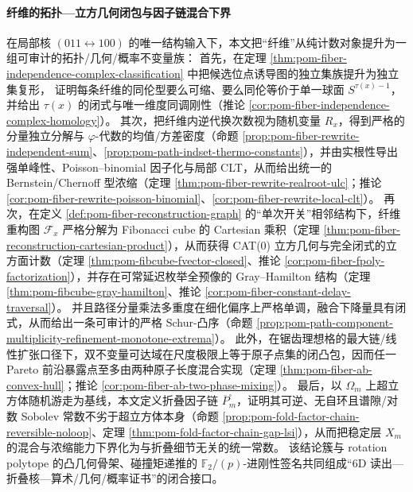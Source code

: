 \paragraph{纤维的拓扑—立方几何闭包与因子链混合下界}
在局部核 \((011\leftrightarrow 100)\) 的唯一结构输入下，本文把“纤维”从纯计数对象提升为一组可审计的拓扑/几何/概率不变量族：
首先，在定理 \ref{thm:pom-fiber-independence-complex-classification} 中把候选位点诱导图的独立集族提升为独立集复形，
证明每条纤维的同伦型要么可缩、要么同伦等价于单一球面 \(S^{\tau(x)-1}\)，并给出 \(\tau(x)\) 的闭式与唯一维度同调刚性（推论 \ref{cor:pom-fiber-independence-complex-homology}）。
其次，把纤维内逆代换次数视为随机变量 \(R_x\)，得到严格的分量独立分解与 \(\varphi\)-代数的均值/方差密度（命题 \ref{prop:pom-fiber-rewrite-independent-sum}、\ref{prop:pom-path-indset-thermo-constants}），并由实根性导出强单峰性、Poisson--binomial 因子化与局部 CLT，从而给出统一的 Bernstein/Chernoff 型浓缩（定理 \ref{thm:pom-fiber-rewrite-realroot-ulc}；推论 \ref{cor:pom-fiber-rewrite-poisson-binomial}、\ref{cor:pom-fiber-rewrite-local-clt}）。
再次，在定义 \ref{def:pom-fiber-reconstruction-graph} 的“单次开关”相邻结构下，纤维重构图 \(\mathcal F_x\) 严格分解为 Fibonacci cube 的 Cartesian 乘积（定理 \ref{thm:pom-fiber-reconstruction-cartesian-product}），从而获得 CAT(0) 立方几何与完全闭式的立方面计数（定理 \ref{thm:pom-fibcube-fvector-closed}、推论 \ref{cor:pom-fiber-fpoly-factorization}），并存在可常延迟枚举全预像的 Gray--Hamilton 结构（定理 \ref{thm:pom-fibcube-gray-hamilton}、推论 \ref{cor:pom-fiber-constant-delay-traversal}）。
并且路径分量乘法多重度在细化偏序上严格单调，融合下降量具有闭式，从而给出一条可审计的严格 Schur-凸序（命题 \ref{prop:pom-path-component-multiplicity-refinement-monotone-extrema}）。
此外，在锯齿理想格的最大链/线性扩张口径下，双不变量可达域在尺度极限上等于原子点集的闭凸包，因而任一 Pareto 前沿暴露点至多由两种原子长度混合实现（定理 \ref{thm:pom-fiber-ab-convex-hull}；推论 \ref{cor:pom-fiber-ab-two-phase-mixing}）。
最后，以 \(\Omega_m\) 上超立方体随机游走为基线，本文定义折叠因子链 \(\overline P^{\square}_m\)，证明其可逆、无自环且谱隙/对数 Sobolev 常数不劣于超立方体本身（命题 \ref{prop:pom-fold-factor-chain-reversible-noloop}、定理 \ref{thm:pom-fold-factor-chain-gap-lsi}），从而把稳定层 \(X_m\) 的混合与浓缩能力下界化为与折叠细节无关的统一常数。
该结论簇与 rotation polytope 的凸几何骨架、碰撞矩递推的 \(\mathbb F_2/(p)\)-进刚性签名共同组成“6D 读出—折叠核—算术/几何/概率证书”的闭合接口。

